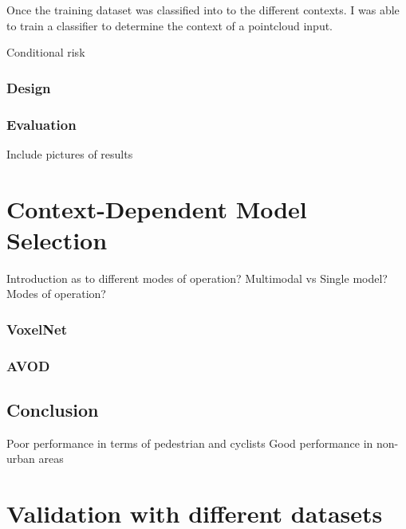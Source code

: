 Once the training dataset was classified into to the different contexts. I was able to train a classifier to determine the context of a pointcloud input. 





Conditional risk 


\subsubsection{Design}

\subsubsection{Evaluation}

Include pictures of results
	

\section{Context-Dependent Model Selection}
Introduction as to different modes of operation?
Multimodal vs Single model?
Modes of operation?

\subsubsection{VoxelNet }

\subsubsection{AVOD} 



\subsection{Conclusion}
Poor performance in terms of pedestrian and cyclists 
Good performance in non-urban areas 

\section{Validation with different datasets}


